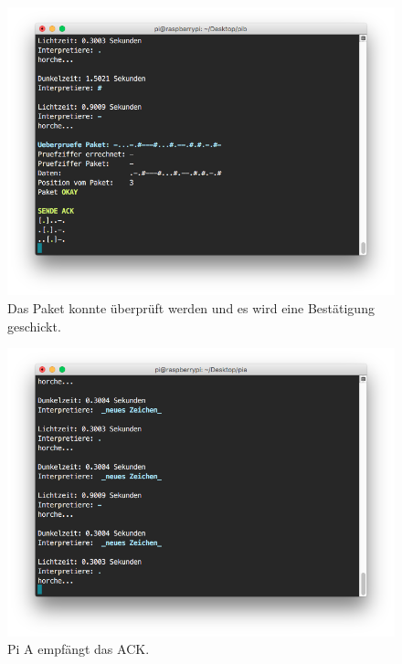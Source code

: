 \documentclass[12pt, a4paper]{article}
\begin{document}
\newpage
\begin{figure}[H]
	\centering
	\includegraphics[width=1.0\textwidth]{sshot_32.png}
	\caption{Das Paket konnte überprüft werden und es wird eine Bestätigung geschickt.}
\end{figure}


\newpage
\begin{figure}[H]
	\centering
	\includegraphics[width=1.0\textwidth]{sshot_33.png}
	\caption{Pi A empfängt das ACK.}
\end{figure}
\end{document}
